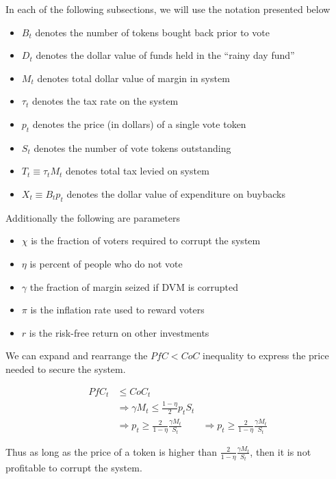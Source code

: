 \documentclass[12pt]{article}
\begin{document}
  In each of the following subsections, we will use the notation presented below

  \begin{itemize}
    \item $B_t$ denotes the number of tokens bought back prior to vote
    \item $D_t$ denotes the dollar value of funds held in the ``rainy day fund''
    \item $M_t$ denotes total dollar value of margin in system
    \item $\tau_t$ denotes the tax rate on the system
    \item $p_t$ denotes the price (in dollars) of a single vote token
    \item $S_t$ denotes the number of vote tokens outstanding
    \item $T_t \equiv \tau_t M_t$ denotes total tax levied on system
    \item $X_t \equiv B_t p_t$ denotes the dollar value of expenditure on buybacks
  \end{itemize}

  Additionally the following are parameters

  \begin{itemize}
    \item $\chi$ is the fraction of voters required to corrupt the system
    \item $\eta$ is percent of people who do not vote
    \item $\gamma$ the fraction of margin seized if DVM is corrupted
    \item $\pi$ is the inflation rate used to reward voters
    \item $r$ is the risk-free return on other investments
  \end{itemize}

  We can expand and rearrange the $PfC < CoC$ inequality to express the price needed to secure the
  system.

  \begin{align*}
    PfC_t &\leq CoC_t \\
    &\Rightarrow \gamma M_t \leq \frac{1 - \eta}{2} p_t S_t \\
    &\Rightarrow p_t \geq \frac{2}{1 - \eta} \frac{\gamma M_t}{S_t}
    &\Rightarrow p_t \geq \frac{2}{1 - \eta} \frac{\gamma M_t}{S_t}
  \end{align*}

  Thus as long as the price of a token is higher than $\frac{2}{1 - \eta} \frac{\gamma M_t}{S_t}$,
  then it is not profitable to corrupt the system.
\end{document}
